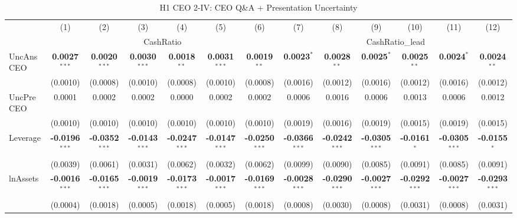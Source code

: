 \begin{landscape}
\begin{table}[H]
\setlength{\tabcolsep}{3pt}
\renewcommand{\arraystretch}{0.85}
\centering
\caption{H1 CEO 2-IV: CEO Q\&A + Presentation Uncertainty}
\label{tab:h1_ceo2}
\scriptsize
\begin{tabular}{lcccccccccccc}
\toprule
 & (1) & (2) & (3) & (4) & (5) & (6) & (7) & (8) & (9) & (10) & (11) & (12) \\
 & \multicolumn{6}{c}{CashRatio} & \multicolumn{6}{c}{CashRatio\_lead} \\
\cmidrule(lr){2-7} \cmidrule(lr){8-13}
\midrule
UncAnsCEO & \textbf{0.0027}$^{***}$ & \textbf{0.0020}$^{***}$ & \textbf{0.0030}$^{***}$ & \textbf{0.0018}$^{**}$ & \textbf{0.0031}$^{***}$ & \textbf{0.0019}$^{**}$ & \textbf{0.0023}$^{*}$ & \textbf{0.0028}$^{**}$ & \textbf{0.0025}$^{*}$ & \textbf{0.0025}$^{**}$ & \textbf{0.0024}$^{*}$ & \textbf{0.0024}$^{**}$ \\
 & (0.0010) & (0.0008) & (0.0010) & (0.0008) & (0.0010) & (0.0008) & (0.0016) & (0.0012) & (0.0016) & (0.0012) & (0.0016) & (0.0012) \\
UncPreCEO & 0.0001 & 0.0002 & 0.0002 & 0.0000 & 0.0002 & 0.0002 & 0.0006 & 0.0016 & 0.0006 & 0.0013 & 0.0006 & 0.0012 \\
 & (0.0010) & (0.0010) & (0.0010) & (0.0010) & (0.0010) & (0.0010) & (0.0019) & (0.0016) & (0.0019) & (0.0015) & (0.0019) & (0.0015) \\
\midrule
Leverage & \textbf{-0.0196}$^{***}$ & \textbf{-0.0352}$^{***}$ & \textbf{-0.0143}$^{***}$ & \textbf{-0.0247}$^{***}$ & \textbf{-0.0147}$^{***}$ & \textbf{-0.0250}$^{***}$ & \textbf{-0.0366}$^{***}$ & \textbf{-0.0242}$^{***}$ & \textbf{-0.0305}$^{***}$ & \textbf{-0.0161}$^{*}$ & \textbf{-0.0305}$^{***}$ & \textbf{-0.0155}$^{*}$ \\
 & (0.0039) & (0.0061) & (0.0031) & (0.0062) & (0.0032) & (0.0062) & (0.0099) & (0.0090) & (0.0085) & (0.0091) & (0.0085) & (0.0091) \\
lnAssets & \textbf{-0.0016}$^{***}$ & \textbf{-0.0165}$^{***}$ & \textbf{-0.0019}$^{***}$ & \textbf{-0.0173}$^{***}$ & \textbf{-0.0017}$^{***}$ & \textbf{-0.0169}$^{***}$ & \textbf{-0.0028}$^{***}$ & \textbf{-0.0290}$^{***}$ & \textbf{-0.0027}$^{***}$ & \textbf{-0.0292}$^{***}$ & \textbf{-0.0027}$^{***}$ & \textbf{-0.0293}$^{***}$ \\
 & (0.0004) & (0.0018) & (0.0005) & (0.0018) & (0.0005) & (0.0018) & (0.0008) & (0.0030) & (0.0008) & (0.0031) & (0.0008) & (0.0031) \\

\end{tabular}
\end{table}
\end{landscape}
